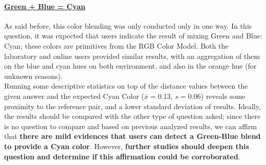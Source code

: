 \paragraph{\ul{Green + Blue = Cyan}}
%
As said before, this color blending was only conducted only in one way. In this question, it was expected that users indicate the result of mixing Green and Blue: Cyan; these colors are primitives from the RGB Color Model. Both the laboratory
and online users provided similar results, with an aggregation of them on the blue and cyan hues on both environment, and also in the orange hue (for unknown reasons).  \\
%
Running some descriptive statistics on top of the distance values between the given answer and the expected Cyan Color ($\overline{x} = 0.13$, $s = 0.06$) reveals some proximity to the reference pair, and a lower standard deviation of results.
Ideally, the results should be compared with the other type of question asked; since there is no question to compare and based on previous analyzed results, we can affirm that \textbf{there are mild evidences that users can detect a Green-Blue blend
to provide a Cyan color}. However, \textbf{further studies should deepen this question and determine if this affirmation could be corroborated}.
%
